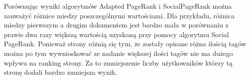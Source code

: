 Porównując wyniki algorytmów Adapted PageRank i SocialPageRank można zauważyć różnice miedzy poszczególnymi wartościami. Dla przykładu, różnica miedzy pierwszym a drugim dokumentem jest bardzo mała w porównaniu z prawie dwa razy większą wartością uzyskaną przy pomocy algorytmu Social PageRank. Ponieważ strony różnią się tym, że zostały opisane różna ilością tagów można po tym wywnioskować ze nadanie większej ilości tagów nie ma dużego wpływu na ranking strony. Za to zmniejszenie liczby użytkowników którzy tą stronę dodali bardzo zmniejsza wynik.



